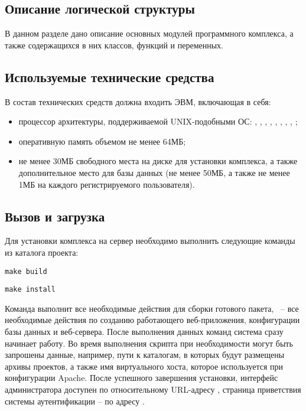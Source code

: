 \subsection{Описание логической структуры}

В данном разделе дано описание основных модулей программного комплекса, а также содержащихся в них классов, функций и переменных.



\subsection{Используемые технические средства}
\label{sec:soft_description:tech}

В состав технических средств должна входить ЭВМ, включающая в себя:
\begin{itemize}
    \item процессор архитектуры, поддерживаемой UNIX-подобными ОС: , , , , , , , , ;
    \item оперативную память объемом не менее 64МБ;
    \item не менее 30МБ свободного места на диске для установки комплекса, а также дополнительное место для базы данных (не менее 50МБ, а также не менее 1МБ на каждого регистрируемого пользователя).
\end{itemize}

\subsection{Вызов и загрузка}

Для установки комплекса на сервер необходимо выполнить следующие команды из каталога проекта:

\begin{lscommand}\verb+make build+\end{lscommand}
\begin{lscommand}\verb+make install+\end{lscommand}

\noindent Команда  выполнит все необходимые действия для сборки готового пакета, ~-- все необходимые действия по созданию работающего веб-приложения, конфигурации базы данных и веб-сервера. После выполнения данных команд система сразу начинает работу. Во время выполнения скрипта при необходимости могут быть запрошены данные, например, пути к каталогам, в которых будут размещены архивы проектов, а также имя виртуального хоста, которое используется при конфигурации Apache. После успешного завершения установки, интерфейс администратора доступен по относительному URL-адресу , страница приветствия системы аутентификации -- по адресу .

